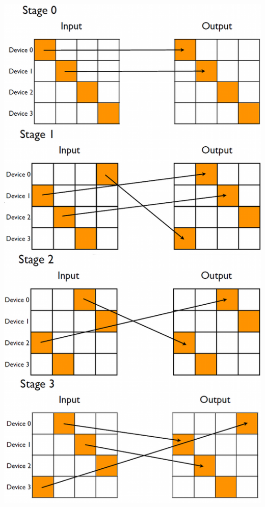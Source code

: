 \documentclass{beamer}
\begin{document}
\begin{frame}
\begin{columns}
\includegraphics[width=\textwidth]{transpose.png}
\end{columns}
\end{frame}
\end{document}

